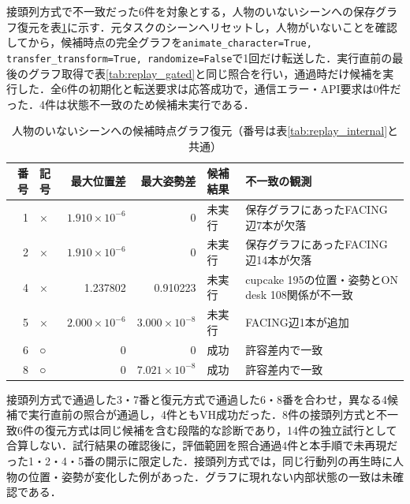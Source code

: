 接頭列方式で不一致だった6件を対象とする，人物のいないシーンへの保存グラフ復元を表\ref{tab:clean_restore}に示す．元タスクのシーンへリセットし，人物がいないことを確認してから，候補時点の完全グラフを\texttt{animate\_character=True, transfer\_transform=True, randomize=False}で1回だけ転送した．実行直前の最後のグラフ取得で表\ref{tab:replay_gated}と同じ照合を行い，通過時だけ候補を実行した．全6件の初期化と転送要求は応答成功で，通信エラー・API要求は0件だった．4件は状態不一致のため候補未実行である．
\begin{table}[tb]
\caption{人物のいないシーンへの候補時点グラフ復元（番号は表\ref{tab:replay_internal}と共通）}\label{tab:clean_restore}
\centering\small
\begin{tabular}{rlrrlp{}}
\hline
番号 & 記号 & 最大位置差 & 最大姿勢差 & 候補結果 & 不一致の観測 \\
\hline
1 & × & $1.910\times10^{-6}$ & 0 & 未実行 & 保存グラフにあったFACING辺7本が欠落 \\
2 & × & $1.910\times10^{-6}$ & 0 & 未実行 & 保存グラフにあったFACING辺14本が欠落 \\
4 & × & 1.237802 & 0.910223 & 未実行 & cupcake 195の位置・姿勢とON desk 108関係が不一致 \\
5 & × & $2.000\times10^{-6}$ & $3.000\times10^{-8}$ & 未実行 & FACING辺1本が追加 \\
6 & ○ & 0 & 0 & 成功 & 許容差内で一致 \\
8 & ○ & 0 & $7.021\times10^{-8}$ & 成功 & 許容差内で一致 \\
\hline
\end{tabular}
\end{table}

接頭列方式で通過した3・7番と復元方式で通過した6・8番を合わせ，異なる4候補で実行直前の照合が通過し，4件ともVH成功だった．8件の接頭列方式と不一致6件の復元方式は同じ候補を含む段階的な診断であり，14件の独立試行として合算しない．試行結果の確認後に，評価範囲を照合通過4件と本手順で未再現だった1・2・4・5番の開示に限定した．接頭列方式では，同じ行動列の再生時に人物の位置・姿勢が変化した例があった．グラフに現れない内部状態の一致は未確認である．



